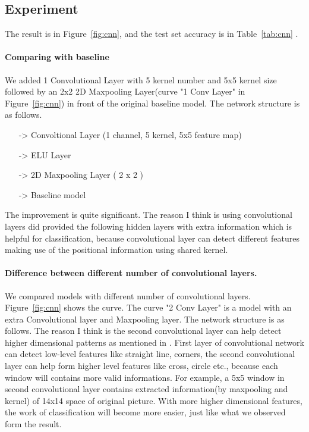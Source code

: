 \documentclass{article}
\begin{document}
\subsection{Experiment}
The result is in Figure~\ref{fig:cnn}, and the test set accuracy is in Table~\ref{tab:cnn} . 
\paragraph{Comparing with baseline} 
We added 1 Convolutional Layer with 5 kernel number and 5x5 kernel size followed by an 2x2 2D Maxpooling Layer(curve "1 Conv Layer" in Figure~\ref{fig:cnn}) in front of the original baseline model. The network structure is as follows.

\begin{itemize}
	\item[->] Convoltional Layer (1 channel, 5 kernel, 5x5 feature map)
	\item[->] ELU Layer
	\item[->] 2D Maxpooling Layer ( 2 x 2 )
	\item[->] Baseline model
\end{itemize}

The improvement is quite significant. The reason I think is using convolutional layers did provided the following hidden layers with extra information which is helpful for classification, because convolutional layer can detect different features making use of the positional information using shared kernel. 

\paragraph{Difference between different number of convolutional layers. }
We compared models with different number of convolutional layers. Figure~\ref{fig:cnn} shows the curve. The curve "2 Conv Layer" is a model with an extra Convolutional layer and Maxpooling layer. The network structure is as follows. The reason I think is the second convolutional layer can help detect higher dimensional patterns as mentioned in \citep{Lecun98gradient-basedlearning}. First layer of convolutional network can detect low-level features like straight line, corners, the second convolutional layer can help form higher level features like cross, circle etc., because each window will contains more valid informations. For example, a 5x5 window in second convolutional layer contains extracted information(by maxpooling and kernel) of 14x14 space of original picture. With more higher dimensional features, the work of classification will become more easier, just like what we observed form the result.
\end{document}
